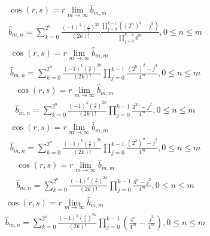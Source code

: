 \documentclass[a4paper,12pt]{report}
\begin{document}
\begin{subequations}
\begin{gather}
\cos(r,s) = r \lim \limits_{m \to \infty} \hat{b}_{m,m} \\
\hat{b}_{m,n} = \sum \limits_{k=0}^{2^n} \frac{(-1)^k \left(\frac{s}{r}\right)^{2k}}{(2k)!} \frac{\prod \limits_{j=0}^{k-1} ((2^n)^2 - j^2)}{\prod \limits_{j=0}^{k-1} 4^m}, 0 \leq n \leq m
\end{gather}
\end{subequations}
\begin{subequations}
\begin{gather}
\cos(r,s) = r \lim \limits_{m \to \infty} \hat{b}_{m,m} \\
\hat{b}_{m,n} = \sum \limits_{k=0}^{2^n} \frac{(-1)^k \left(\frac{s}{r}\right)^{2k}}{(2k)!} \prod \limits_{j=0}^{k-1} \frac{(2^n)^2 - j^2}{4^m}, 0 \leq n \leq m
\end{gather}
\end{subequations}
\begin{subequations}
\begin{gather}
\cos(r,s) = r \lim \limits_{m \to \infty} \hat{b}_{m,m} \\
\hat{b}_{m,n} = \sum \limits_{k=0}^{2^n} \frac{(-1)^k \left(\frac{s}{r}\right)^{2k}}{(2k)!} \prod \limits_{j=0}^{k-1} \frac{2^{2n} - j^2}{4^m}, 0 \leq n \leq m
\end{gather}
\end{subequations}
\begin{subequations}
\begin{gather}
\cos(r,s) = r \lim \limits_{m \to \infty} \hat{b}_{m,m} \\
\hat{b}_{m,n} = \sum \limits_{k=0}^{2^n} \frac{(-1)^k \left(\frac{s}{r}\right)^{2k}}{(2k)!} \prod \limits_{j=0}^{k-1} \frac{(2^2)^n - j^2}{4^m}, 0 \leq n \leq m
\end{gather}
\end{subequations}
\begin{subequations}
\begin{gather}
\cos(r,s) = r \lim \limits_{m \to \infty} \hat{b}_{m,m} \\
\hat{b}_{m,n} = \sum \limits_{k=0}^{2^n} \frac{(-1)^k \left(\frac{s}{r}\right)^{2k}}{(2k)!} \prod \limits_{j=0}^{k-1} \frac{4^n - j^2}{4^m}, 0 \leq n \leq m
\end{gather}
\end{subequations}
\begin{subequations}
\begin{gather}
\cos(r,s) = r \lim \limits_{m \to \infty} \hat{b}_{m,m} \\
\hat{b}_{m,n} = \sum \limits_{k=0}^{2^n} \frac{(-1)^k \left(\frac{s}{r}\right)^{2k}}{(2k)!} \prod \limits_{j=0}^{k-1} \left(\frac{4^n}{4^m} - \frac{j^2}{4^m}\right), 0 \leq n \leq m
\end{gather}
\end{subequations}
\end{document}
